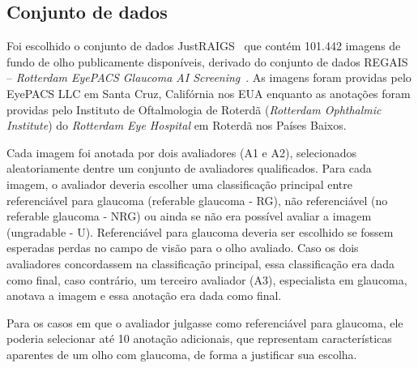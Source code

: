 \documentclass[12pt]{article}
\begin{document}
\subsection{Conjunto de dados}
\label{sec:dataset}

Foi escolhido o conjunto de dados JustRAIGS~\cite{justraigs} que contém 101.442 imagens de fundo de olho publicamente disponíveis, derivado do conjunto de dados REGAIS – \emph{Rotterdam EyePACS Glaucoma AI Screening}~\cite{justraigs_article}. As imagens foram providas pelo EyePACS LLC em Santa Cruz, Califórnia nos EUA enquanto as anotações foram providas pelo Instituto de Oftalmologia de Roterdã (\emph{Rotterdam Ophthalmic Institute}) do \emph{Rotterdam Eye Hospital} em Roterdã nos Países Baixos.

Cada imagem foi anotada por dois avaliadores (A1 e A2), selecionados aleatoriamente dentre um conjunto de avaliadores qualificados. 
Para cada imagem, o avaliador deveria escolher uma classificação principal entre referenciável para glaucoma (referable glaucoma - RG), não referenciável (no referable glaucoma - NRG) ou ainda se não era possível avaliar a imagem (ungradable - U). Referenciável para glaucoma deveria ser escolhido se fossem esperadas perdas no campo de visão para o olho avaliado.
Caso os dois avaliadores concordassem na classificação principal, essa classificação era dada como final, caso contrário, um terceiro avaliador (A3), especialista em glaucoma, anotava a imagem e essa anotação era dada como final.~\cite{justraigs_article}

Para os casos em que o avaliador julgasse como referenciável para glaucoma, ele poderia selecionar até 10 anotação adicionais, que representam características aparentes de um olho com glaucoma, de forma a justificar sua escolha. \cite{justraigs_article}
\end{document}
